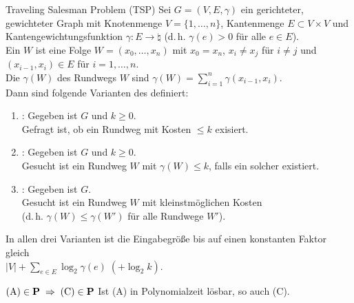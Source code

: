 \begin{Def}{Traveling Salesman Problem (TSP)}
    Sei $G = (V, E, \gamma)$ ein gerichteter, gewichteter Graph mit Knotenmenge
    $V = \{1, \dotsc, n\}$, Kantenmenge $E \subset V \times V$ und Kantengewichtungsfunktion
    $\gamma\colon E \rightarrow \natural$ (d.\,h. $\gamma(e) > 0$ für alle $e \in E$).\\
    Ein  $W$ ist eine Folge $W = (x_0, \dotsc, x_n)$ mit
    $x_0 = x_n$, $x_i \not= x_j$ für $i \not= j$ und
    $(x_{i-1}, x_i) \in E$ für $i = 1, \dotsc, n$.\\
    Die  $\gamma(W)$ des Rundwegs $W$ sind
    $\gamma(W) = \sum_{i=1}^n \gamma(x_{i-1}, x_i)$.\\
    Dann sind folgende Varianten des  definiert:
    \begin{enumerate}[label=(\Alph*)]
        \item
        :
        Gegeben ist $G$ und $k \ge 0$.\\
        Gefragt ist, ob ein Rundweg mit Kosten $\le k$ exisiert.
        
        \item
        :
        Gegeben ist $G$ und $k \ge 0$.\\
        Gesucht ist ein Rundweg $W$ mit $\gamma(W) \le k$, falls ein solcher existiert.
        
        \item
        :
        Gegeben ist $G$.\\
        Gesucht ist ein Rundweg $W$ mit kleinstmöglichen Kosten\\
        (d.\,h. $\gamma(W) \le \gamma(W')$ für alle Rundwege $W'$).
    \end{enumerate}
    In allen drei Varianten ist die Eingabegröße bis auf einen konstanten Faktor gleich\\
    $|V| + \sum_{e \in E} \log_2 \gamma(e) \;(+ \log_2 k)$.
\end{Def}

\linie
\pagebreak

\begin{Satz}{$\text{(A)} \in \P \;\Rightarrow\; \text{(C)} \in \P$}
    Ist (A) in Polynomialzeit lösbar, so auch (C).
\end{Satz}

